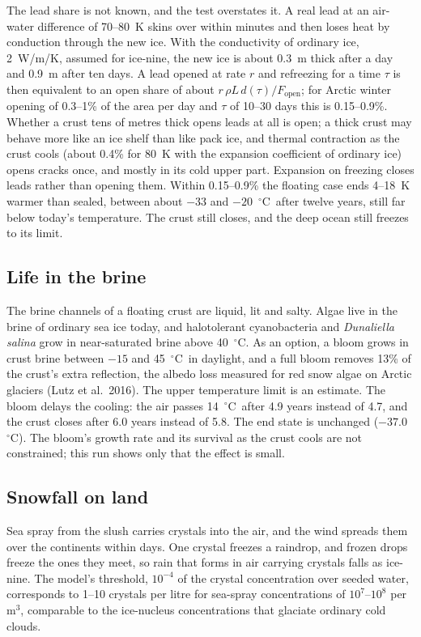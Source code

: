\documentclass[11pt,a4paper]{article}
\newcommand{\degC}{$^{\circ}$C}
\begin{document}
The lead share is not known, and the test overstates it. A real lead at an air-water difference of 70--80~K skins over within minutes and then loses heat by conduction through the new ice. With the conductivity of ordinary ice, 2~W/m/K, assumed for ice-nine, the new ice is about 0.3~m thick after a day and 0.9~m after ten days. A lead opened at rate $r$ and refreezing for a time $\tau$ is then equivalent to an open share of about $r\,\rho L\,d(\tau)/F_\mathrm{open}$; for Arctic winter opening of 0.3--1\% of the area per day and $\tau$ of 10--30 days this is 0.15--0.9\%. Whether a crust tens of metres thick opens leads at all is open; a thick crust may behave more like an ice shelf than like pack ice, and thermal contraction as the crust cools (about 0.4\% for 80~K with the expansion coefficient of ordinary ice) opens cracks once, and mostly in its cold upper part. Expansion on freezing closes leads rather than opening them. Within 0.15--0.9\% the floating case ends 4--18~K warmer than sealed, between about $-33$ and $-20$~\degC\ after twelve years, still far below today's temperature. The crust still closes, and the deep ocean still freezes to its limit.

\subsection{Life in the brine}
\label{sec:life}

The brine channels of a floating crust are liquid, lit and salty. Algae live in the brine of ordinary sea ice today, and halotolerant cyanobacteria and \emph{Dunaliella salina} grow in near-saturated brine above 40~\degC. As an option, a bloom grows in crust brine between $-15$ and 45~\degC\ in daylight, and a full bloom removes 13\% of the crust's extra reflection, the albedo loss measured for red snow algae on Arctic glaciers (Lutz et al.\ 2016). The upper temperature limit is an estimate. The bloom delays the cooling: the air passes 14~\degC\ after 4.9 years instead of 4.7, and the crust closes after 6.0 years instead of 5.8. The end state is unchanged ($-37.0$~\degC). The bloom's growth rate and its survival as the crust cools are not constrained; this run shows only that the effect is small.

\subsection{Snowfall on land}
\label{sec:snow}

Sea spray from the slush carries crystals into the air, and the wind spreads them over the continents within days. One crystal freezes a raindrop, and frozen drops freeze the ones they meet, so rain that forms in air carrying crystals falls as ice-nine. The model's threshold, $10^{-4}$ of the crystal concentration over seeded water, corresponds to 1--10 crystals per litre for sea-spray concentrations of $10^7$--$10^8$ per m$^3$, comparable to the ice-nucleus concentrations that glaciate ordinary cold clouds.
\end{document}
